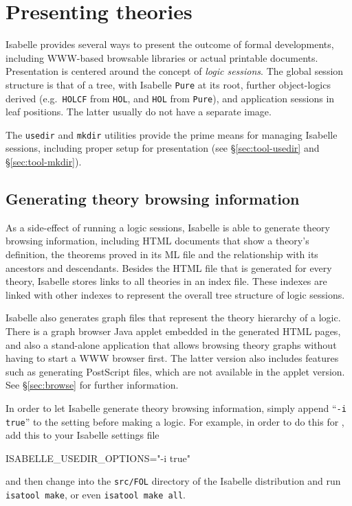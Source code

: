 

\chapter{Presenting theories}

Isabelle provides several ways to present the outcome of formal developments,
including WWW-based browsable libraries or actual printable documents.
Presentation is centered around the concept of \emph{logic sessions}.  The
global session structure is that of a tree, with Isabelle \texttt{Pure} at its
root, further object-logics derived (e.g.\ \texttt{HOLCF} from \texttt{HOL},
and \texttt{HOL} from \texttt{Pure}), and application sessions in leaf
positions.  The latter usually do not have a separate {\ML} image.

The \texttt{usedir} and \texttt{mkdir} utilities provide the prime means for
managing Isabelle sessions, including proper setup for presentation (see
\S\ref{sec:tool-usedir} and \S\ref{sec:tool-mkdir}).


\section{Generating theory browsing information} \label{sec:info}

As a side-effect of running a logic sessions, Isabelle is able to generate
theory browsing information, including HTML documents that show a theory's
definition, the theorems proved in its ML file and the relationship with its
ancestors and descendants.  Besides the HTML file that is generated for every
theory, Isabelle stores links to all theories in an index file. These indexes
are linked with other indexes to represent the overall tree structure of logic
sessions.

Isabelle also generates graph files that represent the theory hierarchy of a
logic.  There is a graph browser Java applet embedded in the generated HTML
pages, and also a stand-alone application that allows browsing theory graphs
without having to start a WWW browser first.  The latter version also includes
features such as generating {\sc PostScript} files, which are not available in
the applet version.  See \S\ref{sec:browse} for further information.

\medskip

In order to let Isabelle generate theory browsing information, simply append
``\texttt{-i true}'' to the  setting before
making a logic.  For example, in order to do this for {\FOL}, add this to your
Isabelle settings file
\begin{ttbox}
ISABELLE_USEDIR_OPTIONS="-i true"
\end{ttbox}
and then change into the \texttt{src/FOL} directory of the Isabelle
distribution and run \texttt{isatool make}, or even \texttt{isatool make all}.

